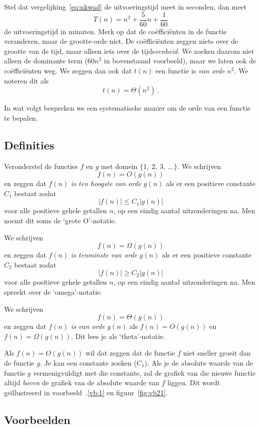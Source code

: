 Stel dat vergelijking~\eqref{eq:nkwad} de uitvoeringstijd meet in seconden, dan meet 
\begin{equation*}
T(n)=n^2+\frac5{60}n+\frac1{60}
\end{equation*}
de uitvoeringstijd in minuten. Merk op dat de coëfficiënten in de functie veranderen, maar de grootte-orde niet. De coëfficiënten zeggen niets over de grootte van de tijd, maar alleen iets over de tijds\emph{eenheid}. We zoeken daarom niet alleen de dominante term ($60n^2$ in bovenstaand voorbeeld), maar we laten ook de coëfficiënten weg. We zeggen dan ook dat $t(n)$ een functie is \emph{van orde} $n^2$. We noteren dit als
\begin{equation*}
t(n)=\Theta(n^2)\,.
\end{equation*}

In wat volgt bespreken we een systematische manier om de orde van een functie te bepalen.

\subsection{Definities}
Veronderstel de functies $f$ en $g$ met domein $\{1,~2,~3,~\dots\}$.
We schrijven
\[
f(n)=O(g(n))
\]
en zeggen dat $f(n)$ \emph{is ten hoogste van orde} $g(n)$ als er een positieve constante $C_1$ bestaat zodat
\[
|f(n)|\leq C_1|g(n)|
\]
voor alle  positieve gehele getallen $n$, op een eindig aantal uitzonderingen na. Men noemt dit soms de `grote O'-notatie.

We schrijven
\[
f(n)=\Omega(g(n))
\]
en zeggen dat $f(n)$ \emph{is tenminste van orde} $g(n)$ als er een positieve constante $C_2$ bestaat zodat
\[
|f(n)|\geq C_2|g(n)|
\]
voor alle  positieve gehele getallen $n$, op een eindig aantal uitzonderingen na.  Men spreekt over de `omega'-notatie.

We schrijven
\[
f(n)=\Theta(g(n))
\]
en zeggen dat $f(n)$ \emph{is van orde} $g(n)$ als $f(n)=O(g(n))$ en $f(n)=\Omega(g(n))$. Dit lees je als `theta'-notatie.

Als $f(n)=O(g(n))$ wil dat zeggen dat de functie $f$ niet sneller groeit dan de functie $g$. Je kan een constante zoeken ($C_1$). Als je de absolute waarde van de  functie $g$ vermenigvuldigt met die constante, zal de grafiek van die nieuwe functie altijd \emph{boven} de grafiek van de absolute waarde van $f$ liggen. Dit wordt geïllustreerd in voorbeeld~\thesection.\ref{vb:1} en figuur~\ref{fig:vb21}.

\subsection{Voorbeelden}


